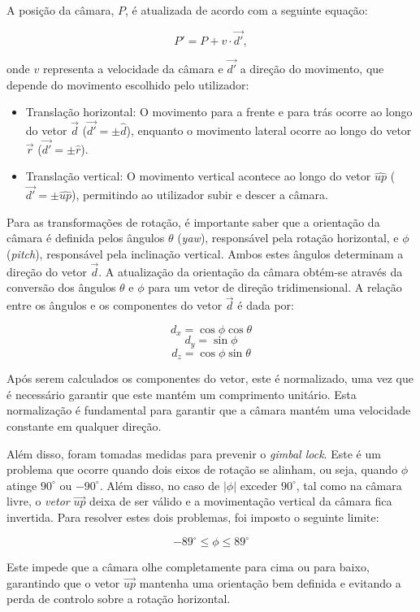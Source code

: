 \documentclass[12pt, a4paper]{article}
\begin{document}
A posição da câmara, $P$, é atualizada de acordo com a seguinte equação:

$$
P' = P + v \cdot \vec{d'},
$$

onde $v$ representa a velocidade da câmara e $\vec{d'}$ a direção do movimento, que depende do
movimento escolhido pelo utilizador:

\begin{itemize}
    \item Translação horizontal: O movimento para a frente e para trás ocorre ao longo do vetor
        $\vec{d}$ ($\vec{d'} = \pm \widehat{d}$), enquanto o movimento lateral ocorre ao longo do
        vetor $\vec{r}$ ($\vec{d'} = \pm \widehat{r}$).
    \item Translação vertical: O movimento vertical acontece ao longo do vetor $\widehat{up}$
        ($\vec{d'} = \pm \widehat{up}$), permitindo ao utilizador subir e descer a câmara.
\end{itemize}

Para as transformações de rotação, é importante saber que a orientação da câmara é definida pelos
ângulos $\theta$ (\emph{yaw}), responsável pela rotação horizontal, e $\phi$ (\emph{pitch}),
responsável pela inclinação vertical. Ambos estes ângulos determinam a direção do vetor $\vec{d}$.
A atualização da orientação da câmara obtém-se através da conversão dos ângulos $\theta$ e $\phi$
para um vetor de direção tridimensional. A relação entre os ângulos e os componentes do vetor
$\vec{d}$ é dada por:

$$d_x = \cos \phi  \cos \theta$$
$$d_y = \sin \phi $$
$$d_z = \cos \phi  \sin \theta$$

Após serem calculados os componentes do vetor, este é normalizado, uma vez que é necessário
garantir que este mantém um comprimento unitário. Esta normalização é fundamental para garantir
que a câmara mantém uma velocidade constante em qualquer direção.

Além disso, foram tomadas medidas para prevenir o \emph{gimbal lock}. Este é um problema que ocorre
quando dois eixos de rotação se alinham, ou seja, quando $\phi$ atinge $90^\circ$ ou $-90^\circ$.
Além disso, no caso de $|\phi|$ exceder $90^\circ$, tal como na câmara livre, o \emph{vetor}
$\vec{up}$ deixa de ser válido e a movimentação vertical da câmara fica invertida. Para resolver
estes dois problemas, foi imposto o seguinte limite:

$$
-89^\circ \leq \phi \leq 89^\circ
$$

Este impede que a câmara olhe completamente para cima ou para baixo, garantindo que o vetor
$\vec{up}$ mantenha uma orientação bem definida e evitando a perda de controlo sobre a rotação
horizontal.
\end{document}
